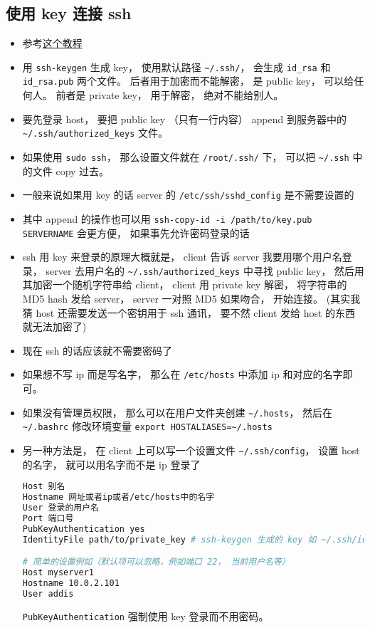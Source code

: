 \subsection{使用 key 连接 ssh}
\begin{itemize}
\item 参考\href{https://www.digitalocean.com/community/tutorials/ssh-essentials-working-with-ssh-servers-clients-and-keys}{这个教程}
\item 用 \verb`ssh-keygen` 生成 key， 使用默认路径 \verb`~/.ssh/`， 会生成 \verb`id_rsa` 和 \verb`id_rsa.pub` 两个文件。 后者用于加密而不能解密， 是 public key， 可以给任何人。 前者是 private key， 用于解密， 绝对不能给别人。
\item 要先登录 host， 要把 public key （只有一行内容） append 到服务器中的 \verb`~/.ssh/authorized_keys` 文件。
\item 如果使用 \verb|sudo ssh|， 那么设置文件就在 \verb|/root/.ssh/| 下， 可以把 \verb|~/.ssh| 中的文件 copy 过去。
\item 一般来说如果用 key 的话 server 的 \verb`/etc/ssh/sshd_config` 是不需要设置的
\item 其中 append 的操作也可以用 \verb`ssh-copy-id -i /path/to/key.pub SERVERNAME` 会更方便， 如果事先允许密码登录的话
\item ssh 用 key 来登录的原理大概就是， client 告诉 server 我要用哪个用户名登录， server 去用户名的 \verb`~/.ssh/authorized_keys` 中寻找 public key， 然后用其加密一个随机字符串给 client， client 用 private key 解密， 将字符串的 MD5 hash 发给 server， server 一对照 MD5 如果吻合， 开始连接。  (其实我猜 host 还需要发送一个密钥用于 ssh 通讯， 要不然 client 发给 host 的东西就无法加密了)
\item 现在 ssh 的话应该就不需要密码了
\item 如果想不写 ip 而是写名字， 那么在 \verb|/etc/hosts| 中添加 ip 和对应的名字即可。
\item 如果没有管理员权限， 那么可以在用户文件夹创建 \verb|~/.hosts|， 然后在 \verb|~/.bashrc| 修改环境变量 \verb|export HOSTALIASES=~/.hosts|
\item 另一种方法是， 在 client 上可以写一个设置文件 \verb`~/.ssh/config`， 设置 host 的名字， 就可以用名字而不是 ip 登录了
\begin{lstlisting}[language=bash]
Host 别名
Hostname 网址或者ip或者/etc/hosts中的名字
User 登录的用户名
Port 端口号
PubKeyAuthentication yes
IdentityFile path/to/private_key # ssh-keygen 生成的 key 如 ~/.ssh/id_rsa

# 简单的设置例如（默认项可以忽略，例如端口 22， 当前用户名等）
Host myserver1
Hostname 10.0.2.101
User addis
\end{lstlisting}
\verb|PubKeyAuthentication| 强制使用 key 登录而不用密码。


\end{itemize}
